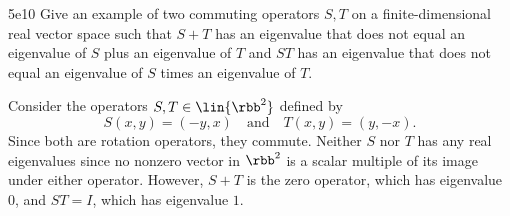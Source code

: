\begin{exercise}{5e10}
    Give an example of two commuting operators $S, T$ on a finite-dimensional real vector space such that $S + T$ has an eigenvalue that does not equal an eigenvalue of $S$ plus an eigenvalue of $T$ and $ST$ has an eigenvalue that does not equal an eigenvalue of $S$ times an eigenvalue of $T$.
    
\end{exercise}

\begin{sol}
    Consider the operators $S, T \in \lin{\rbb^2}$ defined by
    \[
        S(x, y) = (-y, x) \quad \text{and} \quad T(x, y) = (y, -x).
    \]
    Since both are rotation operators, they commute.
    Neither $S$ nor $T$ has any real eigenvalues since no nonzero vector in $\rbb^2$ is a scalar multiple of its image under either operator.
    However, $S + T$ is the zero operator, which has eigenvalue $0$, and $ST = I$, which has eigenvalue $1$.
\end{sol}